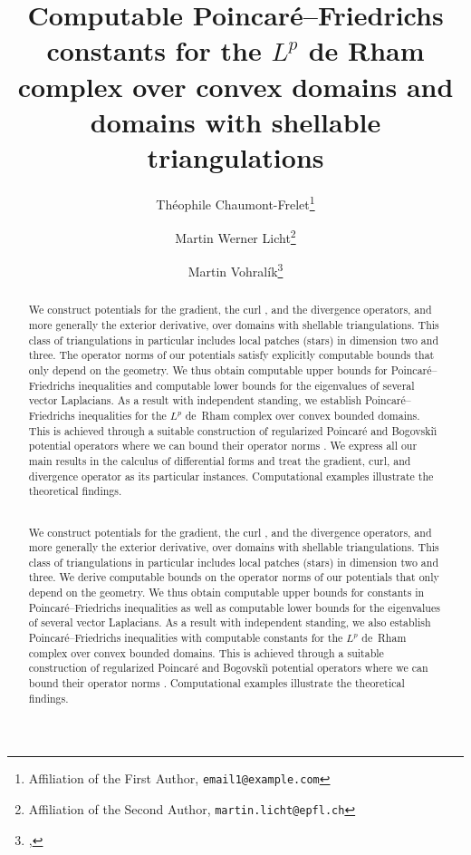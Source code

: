 \documentclass[10pt,letterpaper]{article}
\title{Computable Poincar\'e--Friedrichs constants for the $L^{p}$ de Rham complex over convex domains and domains with shellable triangulations}
\author{
    Th\'eophile Chaumont-Frelet\thanks{Affiliation of the First Author, \texttt{email1@example.com}} \and
    Martin Werner Licht\thanks{Affiliation of the Second Author, \texttt{martin.licht@epfl.ch}} \and
    Martin Vohral\'ik\thanks{\cye{Inria, 48 rue Barrault, 75647 Paris, France \& CERMICS, Ecole des Ponts, 77455 Marne-la-Vall\'ee, France}, \texttt{\cye{martin.vohralik@inria.fr}}}
}
\newcommand\cye[1]{%
\protect\leavevmode
\begingroup
    \color{red!35!yellow}%
    #1%
\endgroup
}
\newcommand{\mwl}[1]{{\color{red}#1}}
\begin{document}
\maketitle

\begin{abstract}
    We construct potentials for the gradient, the curl\cye{,} and the divergence operators, and more generally the exterior derivative, over domains with shellable triangulations. 
    This class of triangulations \cye{in particular} includes local \cye{patches (stars)} in dimension two and three.
    The operator norms of our potentials satisfy explicitly computable bounds that only depend on the geometry. 
    We thus obtain computable upper bounds for Poincar\'e--Friedrichs inequalities and computable lower bounds for the eigenvalues of several vector Laplacians. 
    As a result with independent standing, we establish Poincar\'e--Friedrichs inequalities for the $L^{p}$ de~Rham complex over convex bounded domains. 
    This is achieved through \cye{a suitable construction of regularized} Poincar\'e and Bogovski\u{\i} potential operators \cye{where we can bound their operator norms}.
    \mwl{We express all our main results in the calculus of differential forms and treat the gradient, curl, and divergence operator as its particular instances.} 
    \cye{Computational examples illustrate the theoretical findings.}
    \\
    
    We construct potentials for the gradient, the curl\cye{,} and the divergence operators, and more generally the exterior derivative, over domains with shellable triangulations. 
    This class of triangulations \cye{in particular} includes local \cye{patches (stars)} in dimension two and three.
    \cye{We derive} computable bounds \cye{on} the operator norms of our potentials that only depend on the geometry. We thus obtain computable upper bounds for \cye{constants in} Poincar\'e--Friedrichs inequalities \cye{as well as} computable lower bounds for the eigenvalues of several vector Laplacians.
    As a result with independent standing, we \cye{also} establish Poincar\'e--Friedrichs inequalities \cye{with computable constants} for the $L^{p}$ de~Rham complex over convex bounded domains.
    This is achieved through \cye{a suitable construction of regularized} Poincar\'e and Bogovski\u{\i} potential operators \cye{where we can bound their operator norms}.
    \cye{Computational examples illustrate the theoretical findings.}
\end{abstract}
\end{document}

